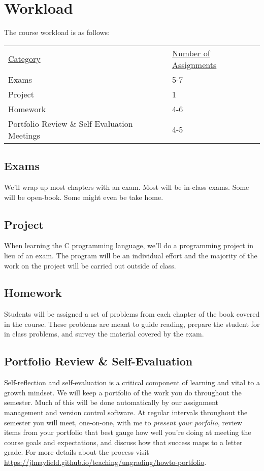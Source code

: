 \documentclass[10pt]{article}
\begin{document}
\section{Workload}

The course workload is as follows:
\begin{center}
  \begin{tabular}{ll}
    \underline{Category} & \underline{Number of Assignments} \\
    Exams & 5-7 \\
    Project & 1 \\
    Homework & 4-6 \\
    Portfolio Review \& Self Evaluation Meetings & 4-5
  \end{tabular}
\end{center}

\subsection*{Exams}

We'll wrap up most chapters with an exam. Most will be in-class exams. Some will be open-book. Some might even be take home.

\subsection*{Project}

When learning the C programming language, we'll do a programming project in lieu of an exam. The program will be an individual effort and the majority of the work on the project will be carried out outside of class. 

\subsection*{Homework}

Students will be assigned a set of problems from each chapter of the book covered in the course. These problems are meant to guide reading, prepare the student for in class problems, and survey the material covered by the exam.

\subsection*{Portfolio Review \& Self-Evaluation}

Self-reflection and self-evaluation is a critical component of learning and vital to a growth mindset.
We will keep a portfolio of the work you do throughout the semester. Much of this will be done automatically
by our assignment management and version control software. At regular intervals throughout the semester you will meet, one-on-one, with me to \textit{present your porfolio}, review items from your portfolio that best 
gauge how well you're doing at meeting the course goals and expectations, and discuss how that success maps to 
a letter grade. For more details about the process visit \url{https://jlmayfield.github.io/teaching/ungrading/howto-portfolio}.
\end{document}
